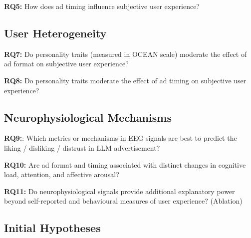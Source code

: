 \documentclass[english]{article}
\begin{document}
\textbf{RQ5:} How does ad timing  influence subjective user experience?


\subsection{User Heterogeneity}

\textbf{RQ7:} Do personality traits (measured in OCEAN scale) moderate the effect of ad format on subjective user experience?

\textbf{RQ8:} Do personality traits moderate the effect of ad timing on subjective user experience?

\subsection{Neurophysiological Mechanisms}
\textbf{RQ9:}: Which metrics or mechanisms in EEG signals are best to predict the liking / disliking / distrust in LLM advertisement?

\textbf{RQ10:} Are ad format and timing associated with distinct changes in cognitive load, attention, and affective arousal?

\textbf{RQ11:} Do neurophysiological signals provide additional explanatory power beyond self-reported and behavioural measures of user experience? (Ablation)


\subsection{Initial Hypotheses}
\end{document}
